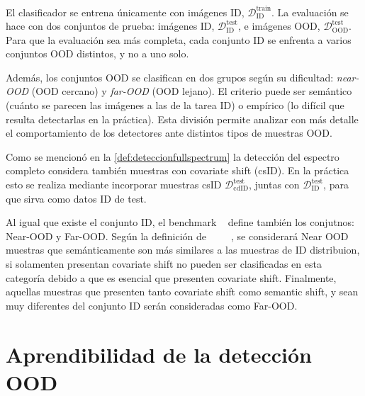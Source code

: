 El clasificador se entrena únicamente con imágenes ID, $\mathcal{D}^{\mathrm{train}}_{\mathrm{ID}}$. La evaluación se hace con dos conjuntos de prueba: imágenes ID,
 $\mathcal{D}^{\mathrm{test}}_{\mathrm{ID}}$, e imágenes OOD, $\mathcal{D}^{\mathrm{test}}_{\mathrm{OOD}}$. Para que la evaluación sea más completa, cada conjunto ID 
 se enfrenta a varios conjuntos OOD distintos, y no a uno solo.

Además, los conjuntos OOD se clasifican en dos grupos según su dificultad: \emph{near-OOD} (OOD cercano) y \emph{far-OOD} (OOD lejano). El criterio
 puede ser semántico (cuánto se parecen las imágenes a las de la tarea ID) o empírico (lo difícil que resulta detectarlas en la práctica). Esta división permite analizar 
 con más detalle el comportamiento de los detectores ante distintos tipos de muestras OOD.

 Como se mencionó en la \cref{def:deteccionfullspectrum} la detección del espectro completo considera también muestras con covariate shift (csID). En la práctica esto se realiza mediante 
 incorporar muestras csID $\mathcal{D}^{\mathrm{test}}_{\mathrm{cdID}}$, juntas con $\mathcal{D}^{\mathrm{test}}_{\mathrm{ID}}$, para que sirva como datos ID de test. 

Al igual que existe el conjunto ID, el benchmark ~\cite{openood15} define también los conjutnos: Near-OOD y Far-OOD.
Según la definición de ~\cite{ren2021} ~\cite{openood15} ~\cite{linmans2023}, se considerará Near OOD muestras que semánticamente son más similares a las muestras 
de ID distribuion, si solamenten presentan covariate shift no pueden ser clasificadas en esta categoría debido a que es esencial que presenten
covariate shift. Finalmente, aquellas muestras que presenten tanto covariate shift como semantic shift, y sean muy diferentes del conjunto ID serán consideradas como Far-OOD.
  

\section{Aprendibilidad de la detección OOD}\label{sec:aprendibilidad}

